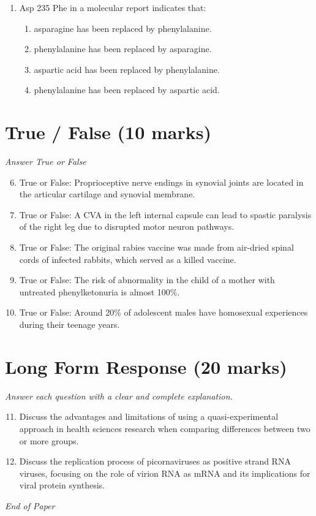 \documentclass[12pt]{article}
\begin{document}
\begin{enumerate}[label=\arabic*.]
\begin{enumerate}[label=(\alph*)]
    \item An older Hispanic American woman
    \item An older African American woman
    \item An older Asian American woman
    \item An older Native American woman
\end{enumerate}
\item Asp 235 Phe in a molecular report indicates that:
\begin{enumerate}[label=(\alph*)]
    \item asparagine has been replaced by phenylalanine.
    \item phenylalanine has been replaced by asparagine.
    \item aspartic acid has been replaced by phenylalanine.
    \item phenylalanine has been replaced by aspartic acid.
\end{enumerate}
\end{enumerate}

\section*{True / False (10 marks)}
\textit{Answer True or False}
\begin{enumerate}[label=\arabic*.]
\setcounter{enumi}{5}
\item True or False: Proprioceptive nerve endings in synovial joints are located in the articular cartilage and synovial membrane.
\item True or False: A CVA in the left internal capsule can lead to spastic paralysis of the right leg due to disrupted motor neuron pathways.
\item True or False: The original rabies vaccine was made from air-dried spinal cords of infected rabbits, which served as a killed vaccine.
\item True or False: The risk of abnormality in the child of a mother with untreated phenylketonuria is almost 100\%.
\item True or False: Around 20\% of adolescent males have homosexual experiences during their teenage years.
\end{enumerate}

\section*{Long Form Response (20 marks)}
\textit{Answer each question with a clear and complete explanation.}
\begin{enumerate}[label=\arabic*.]
\setcounter{enumi}{10}
\item Discuss the advantages and limitations of using a quasi-experimental approach in health sciences research when comparing differences between two or more groups.
\item Discuss the replication process of picornaviruses as positive strand RNA viruses, focusing on the role of virion RNA as mRNA and its implications for viral protein synthesis.
\end{enumerate}

\vfill
\noindent\textit{End of Paper}
\end{document}
